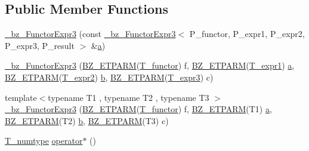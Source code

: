 \subsection*{Public Member Functions}
\begin{DoxyCompactItemize}
\item 
\hyperlink{class__bz__FunctorExpr3_aae63a46d4a5db21e45095185dfe517e3}{\+\_\+bz\+\_\+\+Functor\+Expr3} (const \hyperlink{class__bz__FunctorExpr3}{\+\_\+bz\+\_\+\+Functor\+Expr3}$<$ P\+\_\+functor, P\+\_\+expr1, P\+\_\+expr2, P\+\_\+expr3, P\+\_\+result $>$ \&\hyperlink{gen__mat5files_8m_aae328bf20413f220e38aec4d95bfd6da}{a})
\item 
\hyperlink{class__bz__FunctorExpr3_af618b1263bf3c7ec2677a7c68d4dcb08}{\+\_\+bz\+\_\+\+Functor\+Expr3} (\hyperlink{tuning_8h_a92a6f3aa8f4cd5ac9b4239c449892bb7}{B\+Z\+\_\+\+E\+T\+P\+A\+R\+M}(\hyperlink{class__bz__FunctorExpr3_aae81209846ad3b2cd702513067b9ef91}{T\+\_\+functor}) f, \hyperlink{tuning_8h_a92a6f3aa8f4cd5ac9b4239c449892bb7}{B\+Z\+\_\+\+E\+T\+P\+A\+R\+M}(\hyperlink{class__bz__FunctorExpr3_a39963d1b65dfb09899113c1bcd23aad2}{T\+\_\+expr1}) \hyperlink{gen__mat5files_8m_aae328bf20413f220e38aec4d95bfd6da}{a}, \hyperlink{tuning_8h_a92a6f3aa8f4cd5ac9b4239c449892bb7}{B\+Z\+\_\+\+E\+T\+P\+A\+R\+M}(\hyperlink{class__bz__FunctorExpr3_a942c2f518fa860c92819e1fc7a916511}{T\+\_\+expr2}) \hyperlink{gen__mat5files_8m_a7b38767b3b6a8dae167e5afa4fc340b0}{b}, \hyperlink{tuning_8h_a92a6f3aa8f4cd5ac9b4239c449892bb7}{B\+Z\+\_\+\+E\+T\+P\+A\+R\+M}(\hyperlink{class__bz__FunctorExpr3_a490ef6e4c6ad6c4409b53142860ebaa5}{T\+\_\+expr3}) c)
\item 
{\footnotesize template$<$typename T1 , typename T2 , typename T3 $>$ }\\\hyperlink{class__bz__FunctorExpr3_af83d4d5c7af6af99bfa30951ec115dbb}{\+\_\+bz\+\_\+\+Functor\+Expr3} (\hyperlink{tuning_8h_a92a6f3aa8f4cd5ac9b4239c449892bb7}{B\+Z\+\_\+\+E\+T\+P\+A\+R\+M}(\hyperlink{class__bz__FunctorExpr3_aae81209846ad3b2cd702513067b9ef91}{T\+\_\+functor}) f, \hyperlink{tuning_8h_a92a6f3aa8f4cd5ac9b4239c449892bb7}{B\+Z\+\_\+\+E\+T\+P\+A\+R\+M}(T1) \hyperlink{gen__mat5files_8m_aae328bf20413f220e38aec4d95bfd6da}{a}, \hyperlink{tuning_8h_a92a6f3aa8f4cd5ac9b4239c449892bb7}{B\+Z\+\_\+\+E\+T\+P\+A\+R\+M}(T2) \hyperlink{gen__mat5files_8m_a7b38767b3b6a8dae167e5afa4fc340b0}{b}, \hyperlink{tuning_8h_a92a6f3aa8f4cd5ac9b4239c449892bb7}{B\+Z\+\_\+\+E\+T\+P\+A\+R\+M}(T3) c)
\item 
\hyperlink{class__bz__FunctorExpr3_ad90a6f210859e4b689cd783be74ee748}{T\+\_\+numtype} \hyperlink{class__bz__FunctorExpr3_a809a4e202f1d9cee04ecfc063c117735}{operator$\ast$} ()

\end{DoxyCompactItemize}
